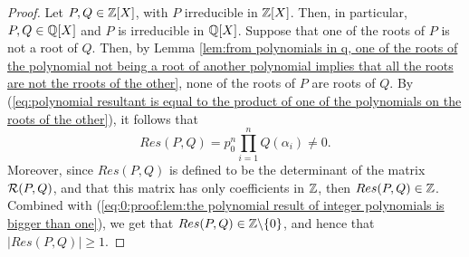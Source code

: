 \begin{proof}
    Let $P,Q \in \mathbb{Z}[X]$, with $P$ irreducible in $\mathbb{Z}[X]$. Then, in particular, $P,Q \in \mathbb{Q}[X]$ and $P$ is irreducible in $\mathbb{Q}[X]$. Suppose that one of the roots of $P$ is not a root of $Q$. Then, by Lemma \ref{lem:from polynomials in q, one of the roots of the polynomial not being a root of another polynomial implies that all the roots are not the rroots of the other}, none of the roots of $P$ are roots of $Q$. By (\ref{eq:polynomial resultant is equal to the product of one of the polynomials on the roots of the other}), it follows that
    \begin{equation}\label{eq:0:proof:lem:the polynomial result of integer polynomials is bigger than one}
        Res(P,Q) = p_0^n \prod_{i=1}^n Q(\alpha_i) \neq 0.
    \end{equation}
    Moreover, since $Res(P,Q)$ is defined to be the determinant of the matrix $\mathcal{R}(P,Q)$, and that this matrix has only coefficients in $\mathbb{Z}$, then $Res(P,Q) \in \mathbb{Z}$. Combined with (\ref{eq:0:proof:lem:the polynomial result of integer polynomials is bigger than one}), we get that $Res(P,Q) \in \mathbb{Z} \backslash \{0\}$, and hence that $|Res(P,Q)| \geq 1$.
\end{proof}

